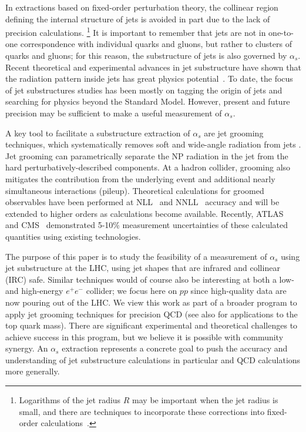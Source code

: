 \documentclass[11pt]{cernrep}
\begin{document}
In extractions based on fixed-order perturbation theory, the collinear region defining the internal
structure of jets is avoided in part due to the lack of precision calculations.%
\footnote{Logarithms of the jet radius $R$ may be important when the jet radius is small, and there are techniques to incorporate these corrections into fixed-order calculations~\cite{Dasgupta:2016bnd,Dasgupta:2014yra}.}
%
It is important to remember that jets are not in one-to-one correspondence with individual quarks and gluons, but rather to clusters of quarks and gluons; for this reason, the substructure of jets is also governed by $\alpha_s$.
%
Recent theoretical and experimental advances in jet substructure have shown that the radiation pattern inside jets has great physics potential~\cite{Abdesselam:2010pt,Altheimer:2012mn,Altheimer:2013yza,Adams:2015hiv,Larkoski:2017jix}.
%
To date, the focus of jet substructures studies has been mostly on tagging the origin of jets and searching for physics beyond the Standard Model.
%
However, present and future precision may be sufficient to make a useful measurement of $\alpha_s$.

A key tool to facilitate a substructure extraction of $\alpha_s$ are jet grooming techniques, which systematically removes soft and wide-angle radiation from jets \cite{Butterworth:2008iy,Ellis:2009su,Ellis:2009me,Krohn:2009th,Dasgupta:2013ihk,Larkoski:2014wba}.
%
Jet grooming can parametrically separate the NP radiation in the jet from the hard perturbatively-described components.
%
At a hadron collider, grooming also mitigates the contribution from the underlying event and additional nearly simultaneous interactions (pileup).
%
Theoretical calculations for groomed observables have been performed at NLL~\cite{Marzani:2017kqd,Marzani:2017mva} and NNLL~\cite{Frye:2016aiz,Frye:2016okc} accuracy and will be extended to higher orders as calculations become available.
%
Recently, ATLAS~\cite{Aaboud:2017qwh} and CMS~\cite{CMS-PAS-SMP-16-010} demonstrated 5-10\% measurement uncertainties of these calculated quantities using existing technologies.

The purpose of this paper is to study the feasibility of a measurement of $\alpha_s$ using jet substructure at the LHC, using jet shapes that are infrared and collinear (IRC) safe.
%
Similar techniques would of course also be interesting at both a low- and high-energy $e^+e^-$ collider; we focus here on $pp$ since high-quality data are now pouring out of the LHC.
%
We view this work as part of a broader program to apply jet grooming techniques for precision QCD (see also \cite{Hoang:2017kmk} for
applications to the top quark mass).
%
There are significant experimental and theoretical challenges to achieve success in this program, but we believe it is possible with community synergy.
%
An $\alpha_s$ extraction represents a concrete goal to push the accuracy and understanding of jet substructure calculations in particular and QCD calculations more generally.
\end{document}
